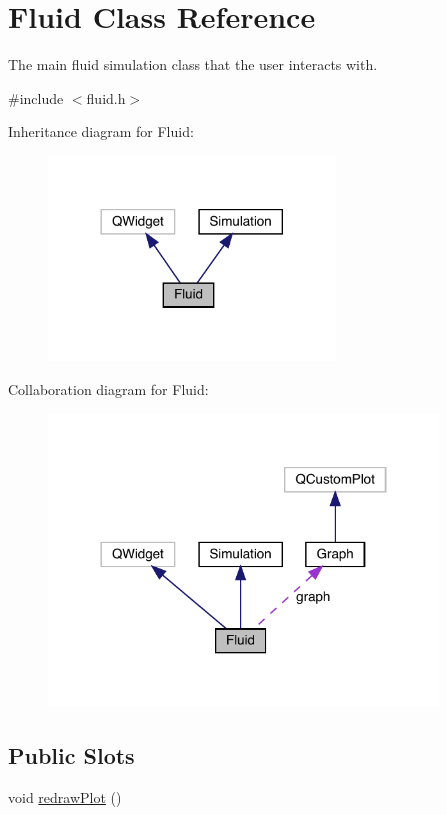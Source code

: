 \hypertarget{classFluid}{}\section{Fluid Class Reference}
\label{classFluid}


The main fluid simulation class that the user interacts with.  




{\ttfamily \#include $<$fluid.\+h$>$}



Inheritance diagram for Fluid\+:\nopagebreak
\begin{figure}[H]
\begin{center}
\leavevmode
\includegraphics[width=216pt]{classFluid__inherit__graph}
\end{center}
\end{figure}


Collaboration diagram for Fluid\+:\nopagebreak
\begin{figure}[H]
\begin{center}
\leavevmode
\includegraphics[width=293pt]{classFluid__coll__graph}
\end{center}
\end{figure}
\subsection*{Public Slots}
\begin{DoxyCompactItemize}
\item 
void \mbox{\hyperlink{classFluid_a020c8985824d3d7be033cb2916d77c24}{redraw\+Plot}} ()
\end{DoxyCompactItemize}
